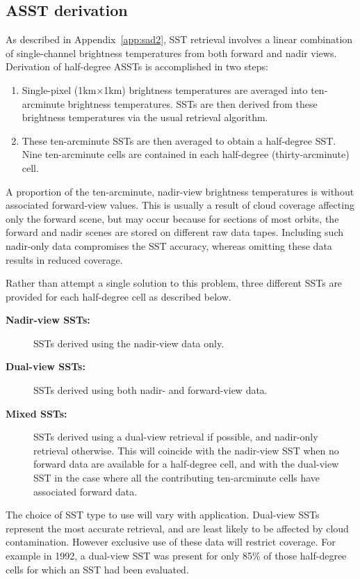 \subsection{ASST derivation} 
\label{subsec:sst_types}

As described in Appendix~\ref{app:sad2}, SST retrieval involves
a linear combination of single-channel brightness temperatures
from both forward and nadir views.
Derivation of half-degree ASSTs is accomplished in two steps:
\begin{enumerate}

\item Single-pixel (1km$\times$1km) brightness temperatures are 
averaged into ten-arcminute brightness temperatures.
SSTs are then derived from these brightness temperatures via the usual 
retrieval algorithm.

\item These ten-arcminute SSTs are then averaged to obtain a half-degree SST. 
Nine ten-arcminute cells are contained in each half-degree (thirty-arcminute)
cell.
\end{enumerate}

A proportion of the ten-arcminute, nadir-view brightness temperatures is 
without associated forward-view values.
This is usually  a result of cloud coverage affecting only the forward
scene, but may occur because for sections of most orbits, the forward and
nadir scenes are stored on different raw data tapes.
Including such nadir-only data compromises the SST accuracy,
whereas omitting these data results in reduced coverage.

Rather than attempt a single solution to this problem, 
three different SSTs are provided for each half-degree cell 
as described below.
\begin{description}
\item[\bf Nadir-view SSTs:] SSTs derived using the nadir-view data only.
\item[\bf Dual-view SSTs:] SSTs derived using both nadir- and forward-view
data.
\item[\bf Mixed SSTs:] SSTs derived using a dual-view retrieval if possible,
and nadir-only retrieval otherwise.
This will coincide with the nadir-view SST when no forward data are available 
for a half-degree cell, and with the dual-view SST  in the case where 
all the contributing ten-arcminute cells have associated forward data.
\end{description}

The choice of SST type to use will vary with application.
Dual-view SSTs represent the most accurate retrieval, and are least 
likely to be affected by cloud contamination.
However exclusive use of these data will restrict coverage.
For example in 1992, a dual-view SST was present for only 85\% of those
half-degree cells for which an SST had been evaluated.

